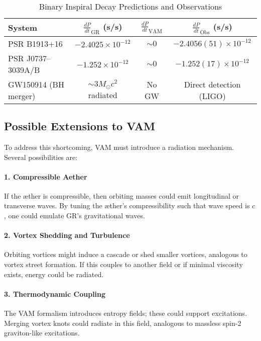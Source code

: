 \begin{table}[h!]
    \centering
    \caption{Binary Inspiral Decay Predictions and Observations}
    \label{tab:gw_comparison}
    \begin{tabular}{lccc}
        \toprule
        System & $\frac{dP}{dt}_{\text{GR}}$ (s/s) & $\frac{dP}{dt}_{\text{VAM}}$ & $\frac{dP}{dt}_{\text{Obs}}$ (s/s) \\
        \midrule
        PSR B1913+16 & $-2.4025\times10^{-12}$ & $\sim 0$ & $-2.4056(51)\times10^{-12}$ \\
        PSR J0737--3039A/B & $-1.252\times10^{-12}$ & $\sim 0$ & $-1.252(17)\times10^{-12}$ \\
        GW150914 (BH merger) & $\sim 3M_\odot c^2$ radiated & No GW & Direct detection (LIGO) \\
        \bottomrule
    \end{tabular}
\end{table}

\subsection*{Possible Extensions to VAM}

To address this shortcoming, VAM must introduce a radiation mechanism. Several possibilities are:

\paragraph{1. Compressible Aether} If the æther is compressible, then orbiting masses could emit longitudinal or transverse waves. By tuning the æther's compressibility such that wave speed is $c$, one could emulate GR's gravitational waves.

\paragraph{2. Vortex Shedding and Turbulence} Orbiting vortices might induce a cascade or shed smaller vortices, analogous to vortex street formation. If this couples to another field or if minimal viscosity exists, energy could be radiated.

\paragraph{3. Thermodynamic Coupling} The VAM formalism introduces entropy fields; these could support excitations. Merging vortex knots could radiate in this field, analogous to massless spin-2 graviton-like excitations.

